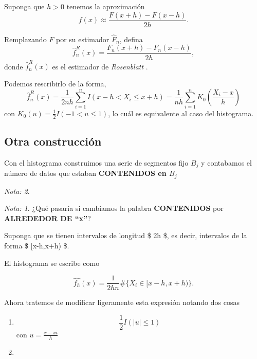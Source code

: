 \documentclass[
  12pt,
]{book}
\theoremstyle{definition}
\theoremstyle{definition}
\theoremstyle{definition}
\theoremstyle{remark}
\newtheorem*{remark}{Nota: }
\begin{document}
Suponga que \(h>0\) tenemos la aproximación
\[
f(x)\approx\frac{F(x+h)-F(x-h)}{2h}.
\]

Remplazando \(F\) por su estimador \(\hat{F}_{n}\), defina
\[
\hat{f}_{n}^{R}(x)=\frac{F_{n}(x+h)-F_{n}(x-h)}{2h},
\]
donde \(\hat{f}_{n}^{R}(x)\) es el estimador de \emph{Rosenblatt }.

Podemos rescribirlo de la forma,
\[
\hat{f}_{n}^{R}(x)=\frac{1}{2nh}\sum_{i=1}^{n}I(x-h<X_{i}\leq x+h)=\frac{1}{nh}\sum_{i=1}^{n}K_{0}\left(\frac{X_{i}-x}{h}\right)
\]
con \(K_{0}(u)=\frac{1}{2}I(-1<u\leq1)\), lo cuál es equivalente al caso del histograma.

\hypertarget{otra-construcciuxf3n}{%
\subsection{Otra construcción}\label{otra-construcciuxf3n}}

Con el histograma construimos una serie de segmentos fijo \(B_{j}\) y contabamos el número de datos que estaban \textbf{CONTENIDOS en \(B_{j}\)}

\begin{remark}
\begin{remark}

{}¿Qué pasaría si cambiamos la palabra \textbf{CONTENIDOS} por \textbf{ALREDEDOR DE ``x''}?

\end{remark}
\end{remark}

Suponga que se tienen intervalos de longitud \$ 2h \$, es decir, intervalos de la forma \$ {[}x-h,x+h) \$.

El histograma se escribe como

\begin{equation*}
\hat{f_{h}}(x) = \dfrac{1}{2hn} \# \{ X_i \in [x-h,x+h) \}.
\end{equation*}

Ahora tratemos de modificar ligeramente esta expresión notando dos cosas

\begin{enumerate}
\def\labelenumi{\arabic{enumi}.}
\item
  \begin{equation*}
  \frac{1}{2} I \left( \left\vert u \right\vert \leq 1 \right)
  \end{equation*}
  con \(u = \frac{x-xi}{h}\)
\item
\end{enumerate}
\end{document}
